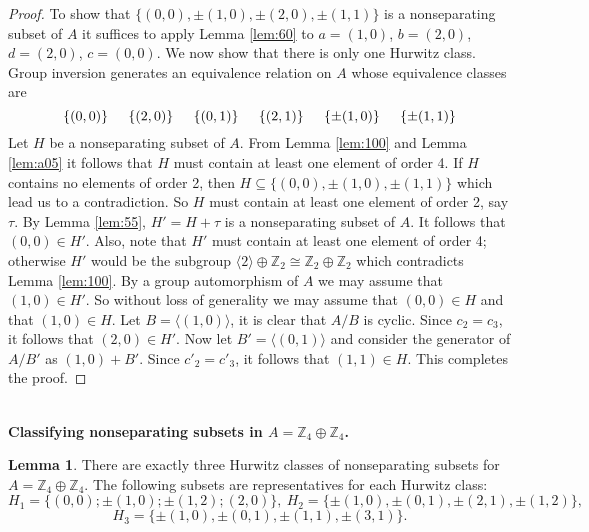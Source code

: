 \documentclass[article,dvisp]{amsart}
\def\Z{\mathbb{Z}}
\theoremstyle{definition}
\newtheorem{lem}[thm]{Lemma}
\theoremstyle{remark}
\numberwithin{equation}{section}
\theoremstyle{lemma}
\begin{document}
\begin{proof} To show that $\{(0,0), \pm(1,0), \pm(2,0), \pm(1,1)\}$ is a nonseparating subset of $A$ it suffices to apply Lemma \ref{lem:60} to $a=(1,0)$, $b=(2,0)$, $d=(2,0)$, $c=(0,0)$. We now show that there is only one Hurwitz class. Group inversion generates an equivalence relation on $A$ whose equivalence classes are 
$$\{(0,0)\}\hspace{.2in}\{(2,0)\}\hspace{.2in}\{(0,1)\}\hspace{.2in}\{(2,1)\}\hspace{.2in}\{\pm(1,0)\}\hspace{.2in}\{\pm(1,1)\}$$
Let $H$ be a nonseparating subset of $A$. From Lemma \ref{lem:100} and Lemma \ref{lem:a05} it follows that $H$ must contain at least one element of order 4. If $H$ contains no elements of order 2, then $H\subseteq\{(0,0),\pm(1,0), \pm(1,1)\}$ which lead us to a contradiction. So $H$ must contain at least one element of order 2, say $\tau$. By Lemma \ref{lem:55}, $H'=H+\tau$ is a nonseparating subset of $A$. It follows that $(0,0)\in H'$. Also, note that $H'$ must contain at least one element of order 4; otherwise $H'$ would be the subgroup $\langle 2\rangle\oplus\Z_{2}\cong\Z_{2}\oplus\Z_{2}$ which contradicts Lemma \ref{lem:100}. By a group automorphism of $A$ we may assume that $(1,0)\in H'$. So without loss of generality we may assume that $(0,0)\in H$ and that $(1,0)\in H$. Let $B=\langle(1,0)\rangle$, it is clear that $A/B$ is cyclic. Since $c_2 = c_3$, it follows that $(2,0)\in H'$. Now let $B'=\langle(0,1)\rangle$ and consider the generator of $A/B'$ as $(1,0)+B'$. Since $c'_{2}=c'_{3}$, it follows that $(1,1)\in H$. This completes the proof.\end{proof}\
\\
\textbf{Classifying nonseparating subsets in $A=\Z_{4}\oplus\Z_{4}$.}
\begin{lem}\label{lem:102}  There are exactly three Hurwitz classes of nonseparating subsets for $A=\Z_{4}\oplus \Z_{4}$. The following subsets are representatives for each Hurwitz class:
$$H_{1}=\{(0,0);\pm(1,0);\pm(1,2);(2,0)\},\ H_{2}=\{\pm(1,0),\pm(0,1),\pm(2,1),\pm(1,2)\},$$
$$H_{3}=\{\pm(1,0),\pm(0,1),\pm(1,1),\pm(3,1)\}.$$
\end{lem}
\end{document}
